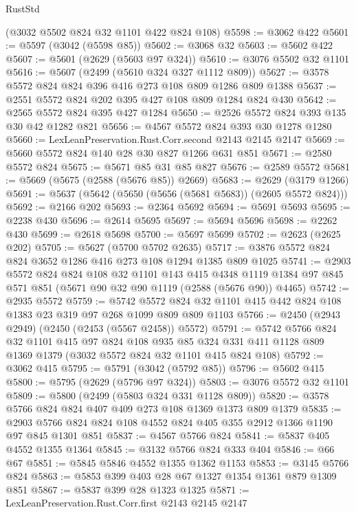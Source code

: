 \begin{lexlean}{RustStd}
\begin{coremodule}
    (@3032 @5502 @824 @32 @1101 @422 @824 @108)
@5598 := @3062 @422
@5601 := @5597 (@3042 (@5598 @85))
@5602 := @3068 @32
@5603 := @5602 @422
@5607 := @5601 (@2629 (@5603 @97 @324))
@5610 := @3076 @5502 @32 @1101
@5616 := @5607 (@2499 (@5610 @324 @327 @1112 @809))
@5627 := @3578 @5572 @824 @824 @396 @416 @273 @108 @809 @1286 @809 @1388
@5637 := @2551 @5572 @824 @202 @395 @427 @108 @809 @1284 @824 @430
@5642 := @2565 @5572 @824 @395 @427 @1284
@5650 := @2526 @5572 @824 @393 @135 @30 @42 @1282 @821
@5656 := @4567 @5572 @824 @393 @30 @1278 @1280
@5660 := LexLeanPreservation.Rust.Corr.second @2143 @2145 @2147
@5669 := @5660 @5572 @824 @140 @28 @30 @827 @1266 @631 @851
@5671 := @2580 @5572 @824
@5675 := @5671 @85 @31 @85 @827
@5676 := @2589 @5572
@5681 := @5669 (@5675 (@2588 (@5676 @85)) @2669)
@5683 := @2629 (@3179 @1266)
@5691 := @5637 (@5642 (@5650 (@5656 (@5681 @5683)) (@2605 @5572 @824)))
@5692 := @2166 @202
@5693 := @2364 @5692
@5694 := @5691 @5693
@5695 := @2238 @430
@5696 := @2614 @5695
@5697 := @5694 @5696
@5698 := @2262 @430
@5699 := @2618 @5698
@5700 := @5697 @5699
@5702 := @2623 (@2625 @202)
@5705 := @5627 (@5700 @5702 @2635)
@5717 := @3876 @5572 @824 @824 @3652 @1286 @416 @273 @108 @1294 @1385 @809 @1025
@5741 := @2903
    @5572
    @824
    @824
    @108
    @32
    @1101
    @143
    @415
    @4348
    @1119
    @1384
    @97
    @845
    @571
    @851
    (@5671 @90 @32 @90 @1119 (@2588 (@5676 @90)) @4465)
@5742 := @2935 @5572
@5759 := @5742
    @5572
    @824
    @32
    @1101
    @415
    @442
    @824
    @108
    @1383
    @23
    @319
    @97
    @268
    @1099
    @809
    @809
    @1103
@5766 := @2450 (@2943 @2949) (@2450 (@2453 (@5567 @2458)) @5572)
@5791 := @5742
    @5766
    @824
    @32
    @1101
    @415
    @97
    @824
    @108
    @935
    @85
    @324
    @331
    @411
    @1128
    @809
    @1369
    @1379
    (@3032 @5572 @824 @32 @1101 @415 @824 @108)
@5792 := @3062 @415
@5795 := @5791 (@3042 (@5792 @85))
@5796 := @5602 @415
@5800 := @5795 (@2629 (@5796 @97 @324))
@5803 := @3076 @5572 @32 @1101
@5809 := @5800 (@2499 (@5803 @324 @331 @1128 @809))
@5820 := @3578 @5766 @824 @824 @407 @409 @273 @108 @1369 @1373 @809 @1379
@5835 := @2903 @5766 @824 @824 @108 @4552 @824 @405 @355 @2912 @1366 @1190 @97 @845 @1301 @851
@5837 := @4567 @5766 @824
@5841 := @5837 @405 @4552 @1355 @1364
@5845 := @3132 @5766 @824 @333 @404
@5846 := @66 @67
@5851 := @5845 @5846 @4552 @1355 @1362 @1153
@5853 := @3145 @5766 @824
@5863 := @5853 @399 @403 @28 @67 @1327 @1354 @1361 @879 @1309 @851
@5867 := @5837 @399 @28 @1323 @1325
@5871 := LexLeanPreservation.Rust.Corr.first @2143 @2145 @2147

\end{coremodule}
\end{lexlean}
